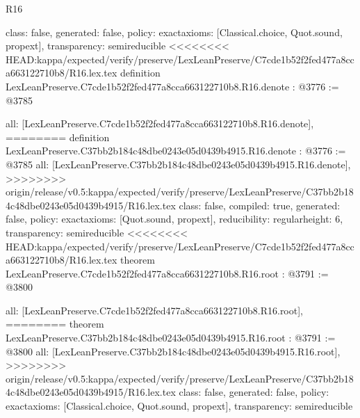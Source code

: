 \begin{lexlean}{R16}
\begin{coremodule}
{{{{{{{{{{{{{{{{  class: false,
  generated: false,
  policy: exact{axioms: [Classical.choice, Quot.sound, propext]},
  transparency: semireducible
}
<<<<<<<< HEAD:kappa/expected/verify/preserve/LexLeanPreserve/C7cde1b52f2fed477a8cca663122710b8/R16.lex.tex
definition LexLeanPreserve.C7cde1b52f2fed477a8cca663122710b8.R16.denote : @3776 := @3785 {
  all: [LexLeanPreserve.C7cde1b52f2fed477a8cca663122710b8.R16.denote],
========
definition LexLeanPreserve.C37bb2b184c48dbe0243e05d0439b4915.R16.denote : @3776 := @3785 {
  all: [LexLeanPreserve.C37bb2b184c48dbe0243e05d0439b4915.R16.denote],
>>>>>>>> origin/release/v0.5:kappa/expected/verify/preserve/LexLeanPreserve/C37bb2b184c48dbe0243e05d0439b4915/R16.lex.tex
  class: false,
  compiled: true,
  generated: false,
  policy: exact{axioms: [Quot.sound, propext]},
  reducibility: regular{height: 6},
  transparency: semireducible
}
<<<<<<<< HEAD:kappa/expected/verify/preserve/LexLeanPreserve/C7cde1b52f2fed477a8cca663122710b8/R16.lex.tex
theorem LexLeanPreserve.C7cde1b52f2fed477a8cca663122710b8.R16.root : @3791 := @3800 {
  all: [LexLeanPreserve.C7cde1b52f2fed477a8cca663122710b8.R16.root],
========
theorem LexLeanPreserve.C37bb2b184c48dbe0243e05d0439b4915.R16.root : @3791 := @3800 {
  all: [LexLeanPreserve.C37bb2b184c48dbe0243e05d0439b4915.R16.root],
>>>>>>>> origin/release/v0.5:kappa/expected/verify/preserve/LexLeanPreserve/C37bb2b184c48dbe0243e05d0439b4915/R16.lex.tex
  class: false,
  generated: false,
  policy: exact{axioms: [Classical.choice, Quot.sound, propext]},
  transparency: semireducible
}

}}}}}}}}}}}}}}}}}
\end{coremodule}
\end{lexlean}
